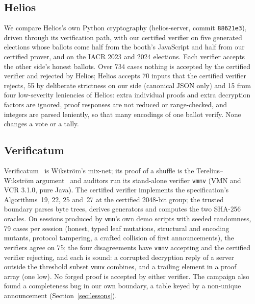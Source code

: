 \subsection{Helios}\label{sec:cs:helios}
We compare Helios's own Python cryptography (helios-server, commit
\texttt{88621e3}), driven through its verification path, with our
certified verifier on five generated elections whose ballots come half
from the booth's JavaScript and half from our certified prover, and on
the IACR 2023 and 2024 elections. Each verifier accepts the other side's
honest ballots. Over 734 cases nothing is accepted by the certified
verifier and rejected by Helios; Helios accepts 70 inputs that the
certified verifier rejects, 55 by deliberate strictness on our side
(canonical JSON only) and 15 from four low-severity leniencies of Helios:
extra individual proofs and extra decryption factors are ignored, proof
responses are not reduced or range-checked, and integers are parsed
leniently, so that many encodings of one ballot verify. None changes a
vote or a tally.

\subsection{Verificatum}\label{sec:cs:verificatum}
Verificatum~\cite{verificatum} is Wikstr\"om's mix-net; its proof of a
shuffle is the Terelius--Wikstr\"om
argument~\cite{terelius2010restricted,10.1007/978-3-642-02620-1_28} and
auditors run its stand-alone verifier \texttt{vmnv} (VMN and VCR 3.1.0,
pure Java). The certified verifier implements the specification's
Algorithms~19, 22, 25 and~27 at the certified 2048-bit group; the trusted
boundary parses byte trees, derives generators and computes the two
SHA-256 oracles. On sessions produced by \texttt{vmn}'s own demo scripts
with seeded randomness, 79 cases per session (honest, typed leaf
mutations, structural and encoding mutants, protocol tampering, a crafted
collision of first announcements), the verifiers agree on 75; the four
disagreements have \texttt{vmnv} accepting and the certified verifier
rejecting, and each is sound: a corrupted decryption reply of a server
outside the threshold subset \texttt{vmnv} combines, and a trailing
element in a proof array (one low). No forged proof is accepted by either
verifier. The campaign also found a completeness bug in our own boundary,
a table keyed by a non-unique announcement (Section~\ref{sec:lessons}).
